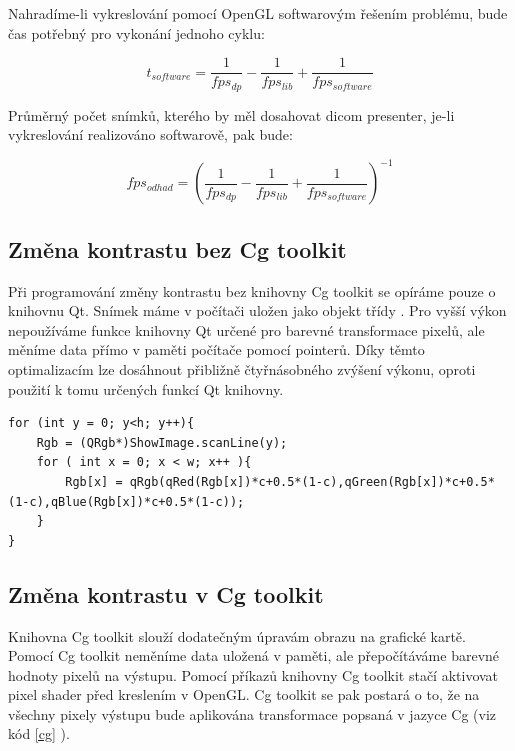 Nahradíme-li vykreslování pomocí OpenGL softwarovým řešením problému, bude čas potřebný pro vykonání jednoho cyklu:

\begin{equation}
t_{software} = \frac{1}{fps_{dp}} - \frac{1}{fps_{lib}} + \frac{1}{fps_{software}}
\end{equation}

Průměrný počet snímků, kterého by měl dosahovat dicom presenter, je-li vykreslování realizováno softwarově, pak bude:

\begin{equation} \label{estimate}
fps_{odhad} = \left(\frac{1}{fps_{dp}} - \frac{1}{fps_{lib}} + \frac{1}{fps_{software}}\right)^{-1}
\end{equation}


\subsection{Změna kontrastu bez Cg toolkit}
Při programování změny kontrastu bez knihovny Cg toolkit se opíráme pouze o knihovnu Qt. Snímek máme v počítači uložen jako objekt třídy . Pro vyšší výkon nepoužíváme funkce knihovny Qt určené pro barevné transformace pixelů, ale měníme data přímo v paměti počítače pomocí pointerů. Díky těmto optimalizacím lze dosáhnout přibližně čtyřnásobného zvýšení výkonu, oproti použití k tomu určených funkcí Qt knihovny.

\begin{lstlisting}[label=DicomImageClass,caption={Změna kontrastu bez použití knihovny Cg toolkit.}]
for (int y = 0; y<h; y++){
	Rgb = (QRgb*)ShowImage.scanLine(y);
	for ( int x = 0; x < w; x++ ){
		Rgb[x] = qRgb(qRed(Rgb[x])*c+0.5*(1-c),qGreen(Rgb[x])*c+0.5*(1-c),qBlue(Rgb[x])*c+0.5*(1-c));
	}
}
\end{lstlisting}

\subsection{Změna kontrastu v Cg toolkit}

Knihovna Cg toolkit slouží dodatečným úpravám obrazu na grafické kartě. Pomocí Cg toolkit neměníme data uložená v paměti, ale přepočítáváme barevné hodnoty pixelů na výstupu. Pomocí příkazů knihovny Cg toolkit stačí aktivovat pixel shader před kreslením v OpenGL. Cg toolkit se pak postará o to, že na všechny pixely výstupu bude aplikována transformace popsaná v jazyce Cg (viz kód \ref{cg} ).

